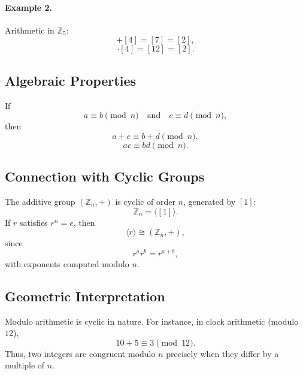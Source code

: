 \documentclass[a4paper,12pt]{article}
\theoremstyle{definition}
\begin{document}
\paragraph{Example 2.} Arithmetic in $\mathbb{Z}_5$:
\begin{equation*}
[3] + [4] = [7] = [2],
\end{equation*}
\begin{equation*}
[3]\cdot[4] = [12] = [2].
\end{equation*}

\subsection{Algebraic Properties}

If
\begin{equation*}
a \equiv b \pmod{n}
\quad \text{and} \quad
c \equiv d \pmod{n},
\end{equation*}
then
\begin{equation*}
a+c \equiv b+d \pmod{n},
\end{equation*}
\begin{equation*}
ac \equiv bd \pmod{n}.
\end{equation*}

\subsection{Connection with Cyclic Groups}

The additive group $(\mathbb{Z}_n,+)$ is cyclic of order $n$, generated by $[1]$:
\begin{equation*}
\mathbb{Z}_n = \langle [1] \rangle.
\end{equation*}
If $r$ satisfies $r^n = e$, then
\begin{equation*}
\langle r \rangle \cong (\mathbb{Z}_n,+),
\end{equation*}
since
\begin{equation*}
r^a r^b = r^{a+b},
\end{equation*}
with exponents computed modulo $n$.

\subsection{Geometric Interpretation}

Modulo arithmetic is cyclic in nature. For instance, in clock arithmetic (modulo $12$),
\begin{equation*}
10 + 5 \equiv 3 \pmod{12}.
\end{equation*}
Thus, two integers are congruent modulo $n$ precisely when they differ by a multiple of $n$.
\end{document}
